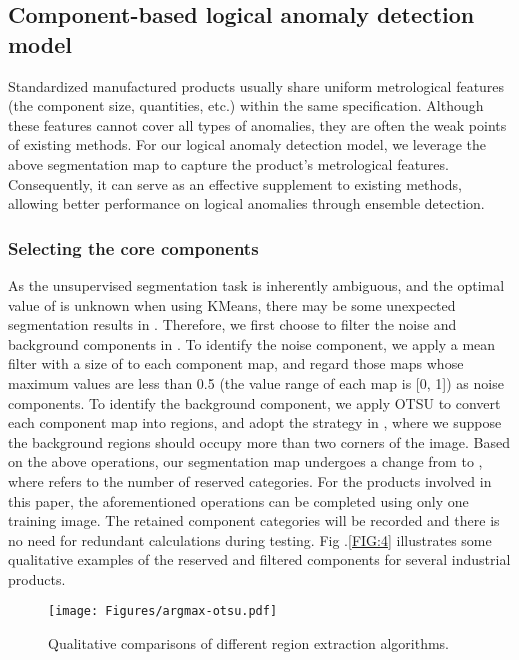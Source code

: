 \documentclass[final,5p,times,twocolumn]{elsarticle}
\begin{document}
\subsection{Component-based logical anomaly detection model}
\label{3.2}
Standardized manufactured products usually share uniform metrological features (the component size, quantities, etc.) within the same specification. Although these features cannot cover all types of anomalies, they are often the weak points of existing methods. For our logical anomaly detection model, we leverage the above segmentation map  to capture the product's metrological features. Consequently, it can serve as an effective supplement to existing methods, allowing better performance on logical anomalies through ensemble detection. 

\subsubsection{Selecting the core components}
\label{3.2.1}
As the unsupervised segmentation task is inherently ambiguous, and the optimal value of  is unknown when using KMeans, there may be some unexpected segmentation results in . Therefore, we first choose to filter the noise and background components in . To identify the noise component, we apply a mean filter with a size of  to each component map, and regard those maps whose maximum values are less than 0.5 (the value range of each map is [0, 1]) as noise components. To identify the background component, we apply OTSU \cite{otsu1979threshold} to convert each component map into regions, and adopt the strategy in \cite{wang2023cut}, where we suppose the background regions should occupy more than two corners of the image. Based on the above operations, our segmentation map undergoes a change from  to , where  refers to the number of reserved categories. For the products involved in this paper, the aforementioned operations can be completed using only one training image. The retained component categories will be recorded and there is no need for redundant calculations during testing. Fig .\ref{FIG:4} illustrates some qualitative examples of the reserved and filtered components for several industrial products.

\begin{figure}
\centering
		\texttt{[image: Figures/argmax-otsu.pdf]}\caption{Qualitative comparisons of different region extraction algorithms.}
	\label{FIG:5}
\end{figure}
\end{document}

